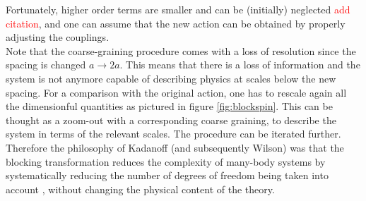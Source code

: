 Fortunately, higher order terms are smaller and can be (initially) neglected \textcolor{red}{add citation}, and one can assume that the new action can be obtained by properly adjusting the couplings. \\
Note that the coarse-graining procedure comes with a loss of resolution since the spacing is changed $a \to 2a$. This means that there is a loss of information and the system is not anymore capable of describing physics at scales below the new spacing. For a comparison with the original action, one has to rescale again all the dimensionful quantities as pictured in figure \ref{fig:blockspin}. This can be thought as a zoom-out with a corresponding coarse graining,
to describe the system in terms of the relevant scales. The procedure can be iterated further. \\
Therefore the philosophy of Kadanoff (and subsequently Wilson) was that the blocking transformation reduces the complexity of many-body
systems by systematically reducing the number of degrees of freedom being taken into account \cite{WILSON197475},
without changing the physical content of the theory.

